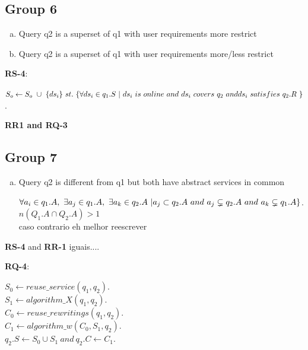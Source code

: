 \subsection{Group 6}
\begin{enumerate}[a)]
\item Query q2 is a superset of q1 with user requirements more restrict
\item Query q2 is a superset of q1 with user requirements more/less restrict
\end{enumerate}

\begin{definition}
\textbf{RS-4}:
\begin{flushleft}
$ S_{o} \leftarrow S_{o} \ \cup \ \lbrace ds_{i} \rbrace\  st.\ \lbrace \forall ds_{i} \in q_{1}.S\ \vert \ ds_{i} \ is \ online\ and\ ds_{i}\ covers\ q_{2}\ and\ \newline ds_{i}\ satisfies\ q_{2}.R\ \rbrace$. \\
\end{flushleft}

\textbf{RR1 and RQ-3}
\end{definition}


\subsection{Group 7}
\begin{enumerate}[a)]
\item Query q2 is different from q1 but both have abstract services in common

\begin{definition}
$ \forall a_{i} \in q_{1}.A,\ \exists a_{j} \in  q_{1}.A,\ \exists a_{k} \in  q_{2}.A\ \vert \newline  
a_{j} \subset  q_{2}.A\ and\ 
a_{j} \subsetneq  q_{2}.A\ and\
a_{k} \subsetneq  q_{1}.A \rbrace$. \\
$n(Q_{1}.A \cap Q_{2}.A) > 1$ \\
caso contrario eh melhor reescrever
\end{definition}
\end{enumerate}

\begin{definition}
\textbf{RS-4} and \textbf{RR-1} iguais....
\end{definition}

\begin{definition}
\textbf{RQ-4}:
\begin{flushleft}
$ S_{0} \leftarrow reuse\_service (q_{1}, q_{2})$. \\
$ S_{1} \leftarrow algorithm\_X (q_{1}, q_{2})$. \\
$ C_{0} \leftarrow reuse\_rewritings (q_{1}, q_{2})$. \\
$ C_{1} \leftarrow algorithm\_w (C_{0}, S_{1}, q_{2})$. \\
$ q_{2}.S \leftarrow S_{0} \cup S_{1}\ and\ q_{2}.C \leftarrow C_{1}$.
\end{flushleft}
\end{definition}

